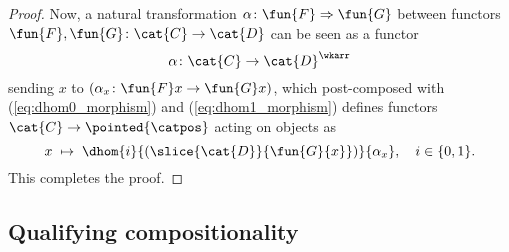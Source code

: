 \begin{proof}
    Now, a natural transformation $\alpha\colon \fun{F} \Rightarrow \fun{G}$ between functors $\fun{F}, \fun{G}\colon \cat{C} \to \cat{D}$ can be seen as a functor
    \begin{equation*}
        \alpha\colon \cat{C} \to \cat{D}^\wkarr
    \end{equation*}
    sending $x$ to $(\alpha_x\colon \fun{F}x \to \fun{G}x)$, which post-composed with (\ref{eq:dhom0_morphism}) and (\ref{eq:dhom1_morphism}) defines functors $\cat{C} \to \pointed{\catpos}$ acting on objects as
    \begin{equation*}
        x \; \mapsto \; \dhom{i}{(\slice{\cat{D}}{\fun{G}{x}})}{\alpha_x}, \quad i \in \{ 0, 1 \}.
    \end{equation*}
    This completes the proof.
    \end{proof}


\subsection{Qualifying compositionality}

